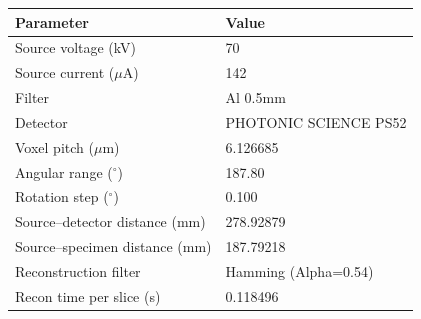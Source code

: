 \begin{tabular}{ll}
\toprule
Parameter & Value \\
\midrule
Source voltage (kV) & 70 \\
Source current ($\mu$A) & 142 \\
Filter & Al 0.5mm \\
Detector & PHOTONIC SCIENCE PS52 \\
Voxel pitch ($\mu$m) & 6.126685 \\
Angular range ($^\circ$) & 187.80 \\
Rotation step ($^\circ$) & 0.100 \\
Source--detector distance (mm) & 278.92879 \\
Source--specimen distance (mm) & 187.79218 \\
Reconstruction filter & Hamming (Alpha=0.54) \\
Recon time per slice (s) & 0.118496 \\
\bottomrule
\end{tabular}

